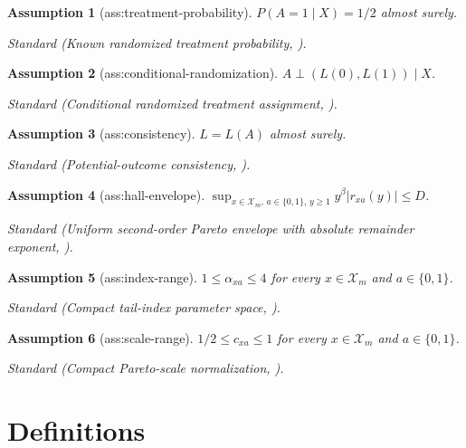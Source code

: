 \documentclass{article}
\newtheorem{assumption}{Assumption}
\begin{document}
\begin{assumption}[ass:treatment-probability]\label{ass:treatment-probability}
\(P(A=1\mid X)=1/2\) almost surely.
\par\smallskip\noindent\emph{Standard} (Known randomized treatment probability, \cite{AtheyWager2021}).
\end{assumption}

\begin{assumption}[ass:conditional-randomization]\label{ass:conditional-randomization}
\(A\perp(L(0),L(1))\mid X\).
\par\smallskip\noindent\emph{Standard} (Conditional randomized treatment assignment, \cite{AtheyWager2021}).
\end{assumption}

\begin{assumption}[ass:consistency]\label{ass:consistency}
\(L=L(A)\) almost surely.
\par\smallskip\noindent\emph{Standard} (Potential-outcome consistency, \cite{AtheyWager2021}).
\end{assumption}

\begin{assumption}[ass:hall-envelope]\label{ass:hall-envelope}
\(\sup_{x\in\mathcal X_m,\,a\in\{0,1\},\,y\ge1}y^{\beta}|r_{xa}(y)|\le D\).
\par\smallskip\noindent\emph{Standard} (Uniform second-order Pareto envelope with absolute remainder exponent, \cite{Hall1982}).
\end{assumption}

\begin{assumption}[ass:index-range]\label{ass:index-range}
\(1\le\alpha_{xa}\le4\) for every \(x\in\mathcal X_m\) and \(a\in\{0,1\}\).
\par\smallskip\noindent\emph{Standard} (Compact tail-index parameter space, \cite{CarpentierKim2015}).
\end{assumption}

\begin{assumption}[ass:scale-range]\label{ass:scale-range}
\(1/2\le c_{xa}\le1\) for every \(x\in\mathcal X_m\) and \(a\in\{0,1\}\).
\par\smallskip\noindent\emph{Standard} (Compact Pareto-scale normalization, \cite{CarpentierKim2015}).
\end{assumption}

\section{Definitions}
\end{document}
